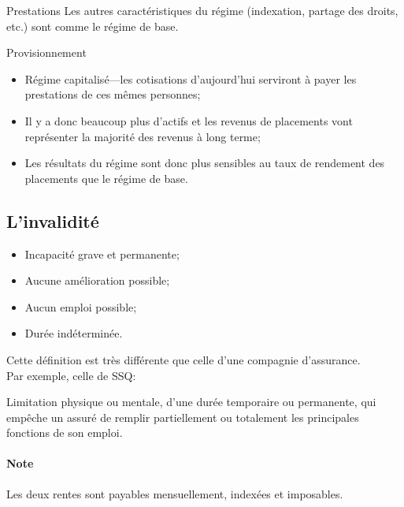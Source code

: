 \documentclass[10pt, french]{article}
\begin{document}
\begin{multicols*}{3}
\begin{conceptgen}{Prestations}
Les autres caractéristiques du régime (indexation, partage des droits, etc.) sont comme le régime de base.
\end{conceptgen}

\begin{conceptgen}{Provisionnement}
\begin{itemize}[leftmargin = *]
	\item	Régime capitalisé---les cotisations d'aujourd'hui serviront à payer les prestations de ces mêmes personnes;
	\item	Il y a donc beaucoup plus d'actifs et les revenus de placements vont représenter la majorité des revenus à long terme;
	\item	Les résultats du régime sont donc plus sensibles au taux de rendement des placements que le régime de base.
\end{itemize}
\end{conceptgen}

\columnbreak

\subsection*{L'invalidité}

\begin{definitionNOHFILL}[Invalide]
\begin{itemize}[leftmargin = *]
	\item	Incapacité grave et permanente;
	\item	Aucune amélioration possible;
	\item	Aucun emploi possible;
	\item	Durée indéterminée.
\end{itemize}

Cette définition est très différente que celle d'une compagnie d'assurance. \\
Par exemple, celle de SSQ:
\begin{center}
	\colorbox{asparagus}{\parbox{0.9\textwidth}{Limitation physique ou mentale, d’une durée temporaire ou permanente, qui empêche un assuré de remplir partiellement ou totalement les principales fonctions de son emploi.}}
\end{center}
\end{definitionNOHFILL}
		
\paragraph*{Note}	Les deux rentes sont payables mensuellement, indexées et imposables.
	

\end{multicols*}
\end{document}
